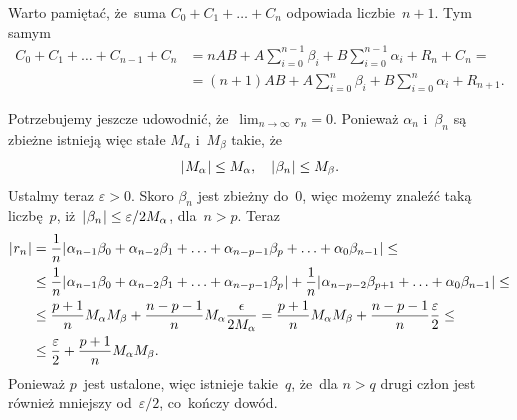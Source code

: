 \documentclass[a4paper,11pt]{article}
\numberwithin{equation}{section}
\begin{document}
Warto pamiętać, że~suma $C_{ 0 } + C_{ 1 } + \ldots + C_{ n }$ odpowiada
liczbie~$n + 1$. Tym samym
\begin{equation}
  \label{eq:Leja-Funkcje-zespolone-27}
  \begin{split}
    C_{ 0 } + C_{ 1 } + \ldots + C_{ n - 1 } + C_{ n }
    &= n A B + A \sum_{ i = 0 }^{ n - 1 } \beta_{ i } + B \sum_{ i = 0 }^{ n - 1 }
      \alpha_{ i } + R_{ n } + C_{ n } = \\
    &= ( n + 1 ) AB + A \sum_{ i = 0 }^{ n } \beta_{ i } + B \sum_{ i = 0 }^{ n } \alpha_{ i }
      + R_{ n + 1 }.
  \end{split}
\end{equation}

\VerSpaceFour





\noindent
{} Potrzebujemy jeszcze udowodnić, że~$\lim_{ n \to \infty } r_{ n } = 0$.
Ponieważ $\alpha_{ n }$ i~$\beta_{ n }$ są zbieżne istnieją więc stałe $M_{ \alpha }$
i~$M_{ \beta }$ takie, że
\begin{equation}
  \label{eq:Leja-Funkcje-zespolone-28}
  | \hspace{0.05em}  M_{ \alpha }  \hspace{0.05em} | \leq M_{ \alpha }, \quad | \hspace{0.05em}  \beta_{ n }  \hspace{0.05em} | \leq M_{ \beta }.
\end{equation}
Ustalmy teraz $\varepsilon > 0$. Skoro $\beta_{ n }$ jest zbieżny do~0, więc możemy
znaleźć taką liczbę~$p$,
iż~$| \hspace{0.05em}  \beta_{ n }  \hspace{0.05em} | \leq \varepsilon / 2 M_{ \alpha }$,
dla~$n > p$. Teraz
\begin{equation}
  \label{eq:Leja-Funkcje-zespolone-29}
  \begin{split}
    | \hspace{0.05em}  r_{ n }  \hspace{0.05em} |
    &=
      \frac{ 1 }{ n } | \hspace{0.05em}  \alpha_{ n - 1 } \beta_{ 0 } + \alpha_{ n - 2 } \beta_{ 1 }
      + \ldots + \alpha_{ n - p - 1 } \beta_{ p } + \ldots + \alpha_{ 0 } \beta_{ n - 1 }  \hspace{0.05em} | \leq \\
    &\leq \frac{ 1 }{ n } | \hspace{0.05em}  \alpha_{ n - 1 } \beta_{ 0 } + \alpha_{ n - 2 } \beta_{ 1 }
      + \ldots + \alpha_{ n - p - 1 } \beta_{ p }  \hspace{0.05em} | + \frac{ 1 }{ n }
      | \hspace{0.05em}  \alpha_{ n - p - 2 } \beta_{ p + 1 } + \ldots + \alpha_{ 0 } \beta_{ n - 1 }  \hspace{0.05em} | \leq \\
    &\leq \frac{ p + 1 }{ n } M_{ \alpha } M_{ \beta }
      + \frac{ n - p - 1 }{ n } M_{ \alpha } \frac{ \epsilon }{ 2 M_{ \alpha } }
      = \frac{ p + 1 }{ n } M_{ \alpha } M_{ \beta } + \frac{ n - p - 1 }{ n }
      \frac{ \varepsilon }{ 2 } \leq \\
    &\leq \frac{ \varepsilon }{ 2 } + \frac{ p + 1 }{ n } M_{ \alpha } M_{ \beta }.
  \end{split}
\end{equation}
Ponieważ $p$~jest ustalone, więc istnieje takie~$q$, że~dla $n > q$
drugi człon jest również mniejszy od~$\varepsilon / 2$, co~kończy dowód.
\end{document}
